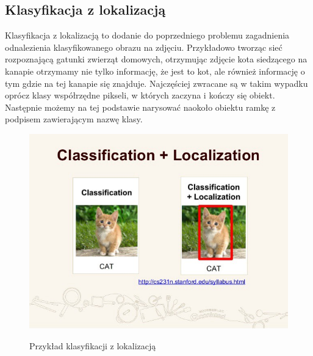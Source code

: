 \documentclass{article}
\begin{document}
\subsection{Klasyfikacja z lokalizacją}
Klasyfikacja z lokalizacją to dodanie do poprzedniego problemu zagadnienia odnalezienia klasyfikowanego obrazu na zdjęciu.
Przykładowo tworząc sieć rozpoznającą gatunki zwierząt domowych, otrzymując zdjęcie kota siedzącego na kanapie otrzymamy nie tylko informację,
że jest to kot, ale również informację o tym gdzie na tej kanapie się znajduje.
Najczęściej zwracane są w takim wypadku oprócz klasy współrzędne pikseli, w których zaczyna i kończy się obiekt.
Następnie możemy na tej podstawie narysować naokoło obiektu ramkę z podpisem zawierającym nazwę klasy.
\begin{figure}[H]
    \centering
    \includegraphics[width=\linewidth]{images/klasyfikacja_z_lokalizacja.jpeg}
    \caption{Przykład klasyfikacji z lokalizacją}
    \cite{unet}
    \label{fig:klasyfikacja_z_lokalizacja}
\end{figure}
\end{document}
